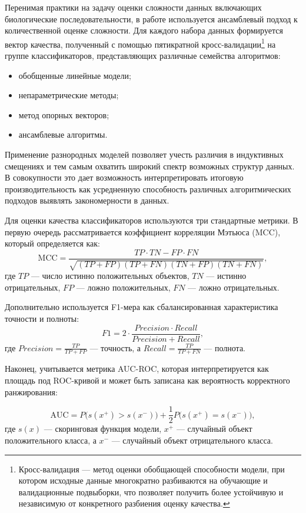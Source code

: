 \documentclass[specification,annotation,times]{itmo-student-thesis}
\begin{document}
Перенимая практики на задачу оценки сложности данных включающих биологические последовательности, в работе используется ансамблевый подход к количественной оценке сложности. Для каждого набора данных формируется вектор качества, полученный с помощью пятикратной кросс-валидации\footnote{Кросс-валидация — метод оценки обобщающей способности модели, при котором исходные данные многократно разбиваются на обучающие и валидационные подвыборки, что позволяет получить более устойчивую и независимую от конкретного разбиения оценку качества.} на группе классификаторов, представляющих различные семейства алгоритмов:
\begin{itemize}
    \item обобщенные линейные модели;
    \item непараметрические методы;
    \item метод опорных векторов;
    \item ансамблевые алгоритмы.
\end{itemize}

Применение разнородных моделей позволяет учесть различия в индуктивных смещениях и тем самым охватить широкий спектр возможных структур данных. В совокупности это дает возможность интерпретировать итоговую производительность как усредненную способность различных алгоритмических подходов выявлять закономерности в данных.

Для оценки качества классификаторов используются три стандартные метрики. В первую очередь рассматривается коэффициент корреляции Мэтьюса (MCC), который определяется как:
\[
\mathrm{MCC} = \frac{TP \cdot TN - FP \cdot FN}{\sqrt{(TP + FP)(TP + FN)(TN + FP)(TN + FN)}},
\]
где $TP$ — число истинно положительных объектов, $TN$ — истинно отрицательных, $FP$ — ложно положительных, $FN$ — ложно отрицательных.

Дополнительно используется F1-мера как сбалансированная характеристика точности и полноты:
\[
F1 = 2 \cdot \frac{Precision \cdot Recall}{Precision + Recall},
\]
где $Precision = \frac{TP}{TP + FP}$ — точность, а $Recall = \frac{TP}{TP + FN}$ — полнота.

Наконец, учитывается метрика AUC-ROC, которая интерпретируется как площадь под ROC-кривой и может быть записана как вероятность корректного ранжирования:

\[
\mathrm{AUC} = P\big( s(x^+) > s(x^-) \big) 
+ \frac{1}{2} P\big( s(x^+) = s(x^-) \big),
\]
где $s(x)$ — скоринговая функция модели, $x^+$ — случайный объект положительного класса, 
а $x^-$ — случайный объект отрицательного класса.
\end{document}
